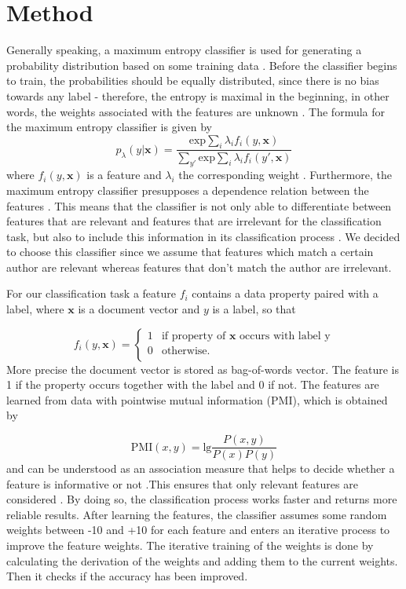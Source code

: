 \documentclass[11pt]{article}
\begin{document}
\section{Method}
Generally speaking, a maximum entropy classifier is used for generating a probability distribution based on some training data \citet{Nigam:1999}. Before the classifier begins to train, the probabilities should be equally distributed, since there is no bias towards any label - therefore, the entropy is maximal in the beginning, in other words, the weights associated with the features are unknown \citet{Nigam:1999}. The formula for the maximum entropy classifier is given by 
\[p_{\lambda}(y|\pmb{x}) = \frac{\text{exp} \sum_i \lambda_i f_i(y,\pmb{x})}{\sum_{y'} \text{exp} \sum_i \lambda_i f_i (y',\pmb{x})}\]
where $f_i(y, \pmb{x})$ is a feature and $\lambda_i$ the corresponding weight \citet{Nigam:1999}.
Furthermore, the maximum entropy classifier presupposes a dependence relation between the features \citet{Osborne:2002}. This means that the classifier is not only able to differentiate between features that are relevant and features that are irrelevant for the classification task, but also to include this information in its classification process \citet{Osborne:2002}.
We decided to choose this classifier since we assume that features which match a certain author are relevant whereas features that don't match the author are irrelevant.

For our classification task a feature $f_{i}$ contains a data property paired with a label, where $\pmb{x}$ is a document vector and $y$ is a label, so that

\[f_{i}(y,\pmb{x})=\begin{cases}
1& \text{if property of }\pmb{x} \text{ occurs with label y}\\
0& \text{otherwise.} \\
\end{cases}\] 
More precise the document vector is stored as bag-of-words vector. The feature is 1 if the property occurs together with the label and 0 if not.
The features are learned from data with pointwise mutual information (PMI), which is obtained by

\[\text{PMI}(x,y)=\text{lg}\frac{P(x,y)}{P(x)P(y)}\]
and can be understood as an association measure that helps to decide whether a feature is informative or not \citet{Bouma:2009}.This ensures that only relevant features are considered \citet{Bouma:2009}. By doing so, the classification process works faster and returns more reliable results.
After learning the features, the classifier assumes some random weights between -10 and +10 for each feature and enters an iterative process to improve the feature weights. The iterative training of the weights is done by calculating the derivation of the weights and adding them to the current weights. Then it checks if the accuracy has been improved. 
\end{document}
